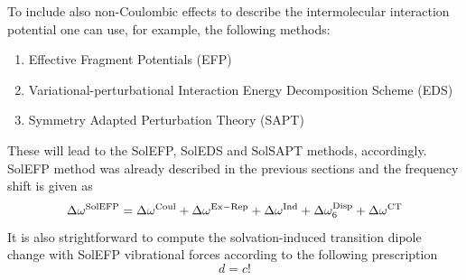 \documentclass[a4paper,titlepage,twoside,fleqn,12pt]{book}
\begin{document}
\begin{refsection}
To include also non\hyp{}Coulombic effects to describe 
the intermolecular interaction potential one can use, for example,
the following methods:
%
\begin{enumerate}
  \item Effective Fragment 
Potentials\citep{Day.Jensen.Gordon.Webb.Stevens.Krauss.Garmer.Basch.Cohen.JCP.1996,
Flick.Kosenkov.Hohenstein.Sherrill.Slipchenko.JCTC.2012} (EFP)
  \item Variational\hyp{}perturbational Interaction Energy Decomposition
Scheme\citep{Sokalski.Roszak.Pecul.CPL.1988,
Chalasinski.Szczesniak.MolPhys.1988,Cybulski.Chalasinski.Moszynski.JCP.1990,
Gora.Bartkowiak.Roszak.Leszczynski.JCP.2004} (EDS)
  \item Symmetry Adapted Perturbation Theory\citep{Jeziorski.Moszynski.Szalewicz.ChemRev.1994} (SAPT)
\end{enumerate}
%
These will lead to the SolEFP, SolEDS and SolSAPT methods, accordingly. 
SolEFP method was already described in the previous sections
and the frequency shift is given as
%
\begin{equation} \label{e:dw-solefp}
\Delta\omega^{\rm SolEFP} = 
\Delta\omega^{\rm Coul} + \Delta\omega^{\rm Ex-Rep} + 
\Delta\omega^{\rm Ind} + \Delta\omega^{\rm Disp}_6 + \Delta\omega^{\rm CT}
\end{equation}
%
It is also strightforward to compute the 
solvation\hyp{}induced transition dipole change
with SolEFP vibrational forces according to the following prescription
%
\begin{equation} \label{e:dmu-solefp}
d = c!
\end{equation}
%


\end{refsection}
\end{document}
